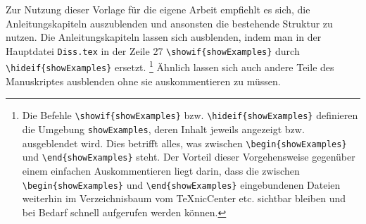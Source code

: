 \begin{showExamples}
Zur Nutzung dieser Vorlage für die eigene Arbeit empfiehlt es sich, die Anleitungskapiteln auszublenden und ansonsten die bestehende Struktur zu nutzen.
Die Anleitungskapiteln lassen sich ausblenden, indem man in der Hauptdatei \texttt{Diss.tex} in der Zeile 27 \verb+\showif{showExamples}+ durch \verb+\hideif{showExamples}+ ersetzt.%
%
\footnote{Die Befehle \verb+\showif{showExamples}+ bzw. \verb+\hideif{showExamples}+ definieren die Umgebung \texttt{showExamples}, deren Inhalt jeweils angezeigt bzw. ausgeblendet wird.
Dies betrifft alles, was zwischen \verb+\begin{showExamples}+ und \verb+\end{showExamples}+ steht.
Der Vorteil dieser Vorgehensweise gegenüber einem einfachen Auskommentieren liegt darin,
dass die zwischen \verb+\begin{showExamples}+ und \verb+\end{showExamples}+ eingebundenen Dateien
weiterhin im Verzeichnisbaum vom TeXnicCenter etc. sichtbar bleiben und bei Bedarf schnell aufgerufen werden können.}
%
Ähnlich lassen sich auch andere Teile des Manuskriptes ausblenden ohne sie auskommentieren zu müssen.
%














%
%
%
%
%
%
%
%
%
\end{showExamples}%